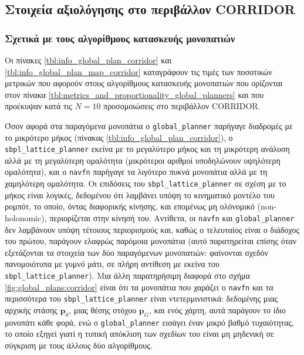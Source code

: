 \subsection{Στοιχεία αξιολόγησης στο περιβάλλον CORRIDOR}
\label{appendix:evaluation_corridor}

\subsubsection{Σχετικά με τους αλγορίθμους κατασκευής μονοπατιών}

Οι πίνακες \ref{tbl:info_global_plan_corridor}
και \ref{tbl:info_global_plan_map_corridor} καταγράφουν τις τιμές
των ποσοτικών μετρικών που αφορούν στους αλγορίθμους κατασκευής μονοπατιών που
ορίζονται στον πίνακα \ref{tbl:metrics_and_proportionality_global_planners} και
που προέκυψαν κατά τις $N = 10$ προσομοιώσεις στο περιβάλλον CORRIDOR.

Όσον αφορά στα παραγόμενα μονοπάτια ο \texttt{global\_planner} παρήγαγε
διαδρομές με το μικρότερο μήκος (πίνακας \ref{tbl:info_global_plan_corridor}),
ο \texttt{sbpl\_lattice\_planner} εκείνα με το μεγαλύτερο μήκος και τη
μικρότερη ανάλυση αλλά με τη μεγαλύτερη ομαλότητα (μικρότεροι αριθμοί
υποδηλώνουν υψηλότερη ομαλότητα), και ο \texttt{navfn} παρήγαγε τα λιγότερο
πυκνά μονοπάτια αλλά με τη χαμηλότερη ομαλότητα. Οι επιδόσεις του
\texttt{sbpl\_lattice\_planner} σε σχέση με το μήκος είναι λογικές, δεδομένου
ότι λαμβάνει υπόψη το κινηματικό μοντέλο του ρομπότ, το οποίο, όντας
διαφορικής κίνησης, και επομένως μη ολόνομικό (non-holonomic), περιορίζεται
στην κίνησή του. Αντίθετα,  οι \texttt{navfn} και \texttt{global\_planner} δεν
λαμβάνουν υπόψη τέτοιους περιορισμούς και, καθώς ο τελευταίος είναι ο διάδοχος
του πρώτου, παράγουν ελαφρώς παρόμοια μονοπάτια (αυτό παρατηρείται επίσης όταν
εξετάζονται τα στοιχεία των δύο παραγόμενων μονοπατιών: φαίνονται σχεδόν
πανομοιότυπα με γυμνό μάτι, σε πλήρη αντίθεση με εκείνα του
\texttt{sbpl\_lattice\_planner}). Μια άλλη παρατηρήσιμη διαφορά στο σχήμα
\ref{fig:global_plans:corridor} είναι ότι τα μονοπάτια που χαράζει ο
\texttt{navfn} και τα περισσότερα του \texttt{sbpl\_lattice\_planner} είναι
ντετερμινιστικά: δεδομένης μιας αρχικής στάσης $\bm{p}_0$, μιας θέσης στόχου
$\bm{p}_G$, και ενός χάρτη, αυτά παράγουν το ίδιο μονοπάτι κάθε φορά, ενώ ο
\texttt{global\_planner} εισάγει έναν μικρό βαθμό τυχαιότητας, το οποίο εξηγεί
γιατί η τυπική απόκλιση των σχεδίων του είναι μη μηδενική σε σύγκριση με τους
άλλους δύο αλγορίθμους.

